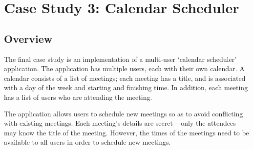 \section{Case Study 3: Calendar Scheduler}

%
%
%
%
%
%
%
%
%
%
%
%
%
%
%

\subsection{Overview}

The final case study is an implementation of a multi-user `calendar scheduler' application. The application has multiple users, each with their own calendar. A calendar consists of a list of meetings; each meeting has a title, and is associated with a day of the week and starting and finishing time. In addition, each meeting has a list of users who are attending the meeting.

The application allows users to schedule new meetings so as to avoid conflicting with existing meetings. Each meeting's details are secret -- only the attendees may know the title of the meeting. However, the times of the meetings need to be available to all users in order to schedule new meetings.

